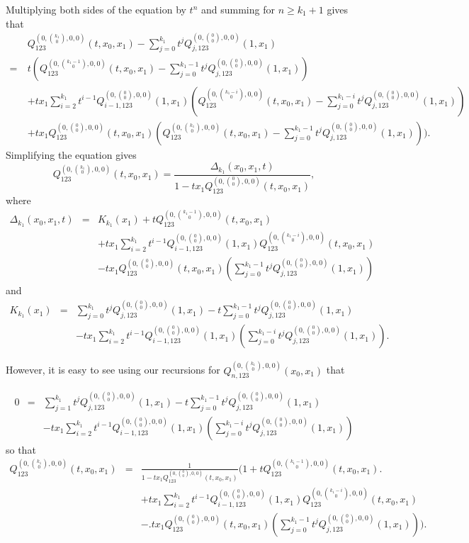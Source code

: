 \documentclass[
final,nomarks
]{dmtcs-episciences}
\newcommand{\Qmz}[2]{Q_{123}^{(0,\binom{#1}{#2},0,0)}(t,x_0,x_1)}
\newcommand{\Qmzn}[3]{Q_{#3,123}^{(0,\binom{#1}{#2},0,0)}(x_0,x_1)}
\begin{document}
Multiplying both sides of the equation by \begin{math}t^n\end{math} and summing for \begin{math}n\geq k_1+1\end{math} gives that
\begin{align}
&\Qmz{k_1}{0}-\sum_{j=0}^{k_1}t^j Q_{j,123}^{(0,\binom{0}{0},0,0)}(1,x_1)  \nonumber\\\nonumber
=\ &t(\Qmz{k_1-1}{0}-\sum_{j=0}^{k_1-1}t^j Q_{j,123}^{(0,\binom{0}{0},0,0)}(1,x_1))\ \\\nonumber
& +t x_1\sum_{i=2}^{k_1}t^{i-1}Q_{i-1,123}^{(0,\binom{0}{0},0,0)}(1,x_1) 
(\Qmz{k_1-i}{0}-\sum_{j=0}^{k_1-i}t^j Q_{j,123}^{(0,\binom{0}{0},0,0)}(1,x_1))\ \\
&+t x_1\Qmz{0}{0}(\Qmz{k_1}{0}-\sum_{j=0}^{k_1-1}t^j Q_{j,123}^{(0,\binom{0}{0},0,0)}(1,x_1))). 
\end{align}
Simplifying the equation gives
\begin{equation}
	\Qmz{k_1}{0}=\frac{\Delta_{k_1}(x_0,x_1,t)}{1-t x_1\Qmz{0}{0}},
\end{equation}
where 
\begin{eqnarray}
	\Delta_{k_1}(x_0,x_1,t) &=& K_{k_1}(x_1) + t \Qmz{k_1-1}{0} \nonumber\\\nonumber
	&&+ t x_1 \sum_{i=2}^{k_1} t^{i-1} Q_{i-1,123}^{(0,\binom{0}{0},0,0)}(1,x_1)\Qmz{k_1-i}{0}\\
	&&-  t x_1\Qmz{0}{0}(\sum_{j=0}^{k_1-1}t^j Q_{j,123}^{(0,\binom{0}{0},0,0)}(1,x_1))
\end{eqnarray}
and
\begin{eqnarray}
	K_{k_1}(x_1) &=& \sum_{j=0}^{k_1}t^j Q_{j,123}^{(0,\binom{0}{0},0,0)}(1,x_1) -t 
	\sum_{j=0}^{k_1-1}t^j Q_{j,123}^{(0,\binom{0}{0},0,0)}(1,x_1)\nonumber\\
	&&- t x_1\sum_{i=2}^{k_1}t^{i-1}Q_{i-1,123}^{(0,\binom{0}{0},0,0)}(1,x_1)
	(\sum_{j=0}^{k_1-i}t^j Q_{j,123}^{(0,\binom{0}{0},0,0)}(1,x_1)).
\end{eqnarray}

However, it is easy to see using our recursions for \begin{math}\Qmzn{k_1}{0}{n}\end{math} that 

\begin{eqnarray}
	0&=& \sum_{j=1}^{k_1}t^j Q_{j,123}^{(0,\binom{0}{0},0,0)}(1,x_1) -t 
	\sum_{j=0}^{k_1-1}t^j Q_{j,123}^{(0,\binom{0}{0},0,0)}(1,x_1)\nonumber\\
	&&- t x_1\sum_{i=2}^{k_1}t^{i-1}Q_{i-1,123}^{(0,\binom{0}{0},0,0)}(1,x_1)
	(\sum_{j=0}^{k_1-i}t^j Q_{j,123}^{(0,\binom{0}{0},0,0)}(1,x_1))
\end{eqnarray}
so that 
\begin{eqnarray}
	\Qmz{k_1}{0}&=&\frac{1}{1-t x_1\Qmz{0}{0}}\biggl(1+ t\Qmz{k_1-1}{0} \biggr. \nonumber\\\nonumber
	&& +t x_1\sum_{i=2}^{k_1}t^{i-1}Q_{i-1,123}^{(0,\binom{0}{0},0,0)}(1,x_1)\Qmz{k_1-i}{0}\\
	&&-\biggl. t x_1\Qmz{0}{0}(\sum_{j=0}^{k_1-1}t^j Q_{j,123}^{(0,\binom{0}{0},0,0)}(1,x_1))\biggr).
\end{eqnarray}
\end{document}
